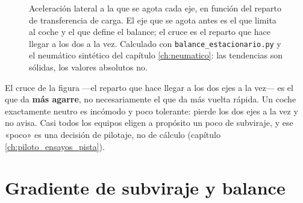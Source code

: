 \begin{figure}[htbp]
\centering
{}
\caption[Balance frente al reparto de transferencia de carga]{Aceleración
lateral a la que se agota cada eje, en función del reparto de transferencia de
carga. El eje que se agota antes es el que limita al coche y el que define el
balance; el cruce es el reparto que hace llegar a los dos a la vez. Calculado
con \texttt{balance\_estacionario.py} y el neumático sintético del capítulo
\ref{ch:neumatico}: las tendencias son sólidas, los valores absolutos no.}
\label{fig:estacionario:lltd}
\end{figure}

\begin{ojo}
El cruce de la figura ---el reparto que hace llegar a los dos ejes a la vez---
es el que da \textbf{más agarre}, no necesariamente el que da más vuelta
rápida. Un coche exactamente neutro es incómodo y poco tolerante: pierde los
dos ejes a la vez y no avisa. Casi todos los equipos eligen a propósito un poco
de subviraje, y ese «poco» es una decisión de pilotaje, no de cálculo
(capítulo \ref{ch:piloto_ensayos_pista}).
\end{ojo}

\section{Gradiente de subviraje y balance}
\label{sec:regimen_estacionario:05}

